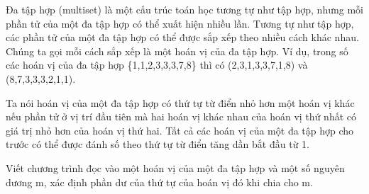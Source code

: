 Đa tập hợp (multiset) là một cấu trúc toán học tương tự như tập hợp, nhưng mỗi phần tử của một đa tập hợp có thể xuất hiện nhiều lần. Tương tự như tập hợp, các phần tử của một đa tập hợp có thể được sắp xếp theo nhiều cách khác nhau. Chúng ta gọi mỗi cách sắp xếp là một hoán vị của đa tập hợp. Ví dụ, trong số các hoán vị của đa tập hợp \{1,1,2,3,3,3,7,8\} thì có (2,3,1,3,3,7,1,8) và (8,7,3,3,3,2,1,1).  

   Ta nói hoán vị của một đa tập hợp có thứ tự từ điển nhỏ hơn một hoán vị khác nếu phần tử ở vị trí đầu tiên mà hai hoán vị khác nhau của hoán vị thứ nhất có giá trị nhỏ hơn của hoán vị thứ hai. Tất cả các hoán vị của một đa tập hợp cho trước có thể được đánh số theo thứ tự từ điển tăng dần bắt đầu từ 1.  

Viết chương trình đọc vào một hoán vị của một đa tập hợp và một số nguyên dương m, xác định phần dư của thứ tự của hoán vị đó khi chia cho m.